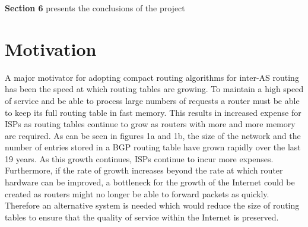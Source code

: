 \documentclass{dissertation/mpaper}
\begin{document}
\textbf{Section 6} presents the conclusions of the project \newline


\section{Motivation}

A major motivator for adopting compact routing algorithms for inter-AS routing has been the speed at which routing tables are growing. To maintain a high speed of service and be able to process large numbers of requests a router must be able to keep its full routing table in fast memory. This results in increased expense for ISPs as routing tables continue to grow as routers with more and more memory are required. As can be seen in figures 1a and 1b, the size of the network and the number of entries stored in a BGP routing table have grown rapidly over the last 19 years. As this growth continues, ISPs continue to incur more expenses. Furthermore, if the rate of growth increases beyond the rate at which router hardware can be improved, a bottleneck for the growth of the Internet could be created as routers might no longer be able to forward packets as quickly. Therefore an alternative system is needed which would reduce the size of routing tables to ensure that the quality of service within the Internet is preserved. 
\end{document}
